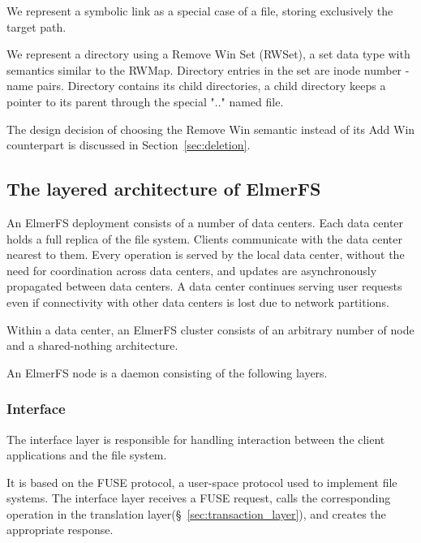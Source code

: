 \documentclass[sigconf, 10pt]{acmart}
\begin{document}
We represent a symbolic link as a special case of a file, storing exclusively the target path.

We represent a directory using a Remove Win Set (RWSet), a set data type with semantics similar to the RWMap. Directory entries in the set are inode number - name pairs. Directory contains its child directories, a child directory keeps a pointer to its parent through the special ".." named file.


The design decision of choosing the Remove Win semantic instead of its Add Win counterpart is discussed in Section~\ref{sec:deletion}.

\subsection{The layered architecture of ElmerFS}

An ElmerFS deployment consists of a number of data centers.
Each data center holds a full replica of the file system.
Clients communicate with the data center nearest to them.
Every operation is served by the local data center, without the need
for coordination across data centers,
and updates are asynchronously propagated between data centers.
A data center continues serving user requests even if connectivity
with other data centers is lost due to network partitions.

Within a data center, an ElmerFS cluster consists of an arbitrary number
of node and a shared-nothing architecture.

An ElmerFS node is a daemon consisting of the following layers.

\subsubsection{Interface}

The interface layer is responsible for handling interaction between the client applications
and the file system.

It is based on the FUSE protocol, a user-space protocol used to implement
file systems. The interface layer receives a FUSE request, calls the corresponding operation in the translation layer(\S~\ref{sec:transaction_layer}), and creates the appropriate response.
\end{document}
